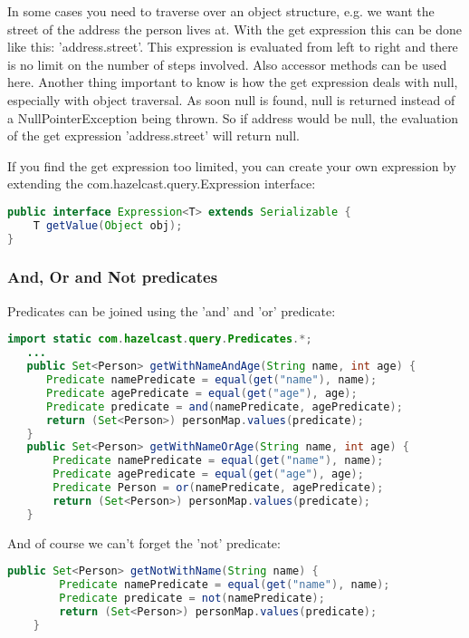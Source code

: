 In some cases you need to traverse over an object structure, e.g. we want the street of the address the person lives at. With the get expression this can be done like this: 'address.street'. This expression is evaluated from left to right and there is no limit on the number of steps involved. Also accessor methods can be used here. Another thing important to know is how the get expression deals with null, especially with object traversal. As soon null is found, null is returned instead of a NullPointerException being thrown. So if address would be null, the evaluation of the get expression 'address.street' will return null.

If you find the get expression too limited, you can create your own expression by extending the com.hazelcast.query.Expression interface:
\begin{lstlisting}[language=java]
public interface Expression<T> extends Serializable {
    T getValue(Object obj);
}
\end{lstlisting}

\subsubsection*{And, Or and Not predicates}
Predicates can be joined using the 'and' and 'or' predicate:
\begin{lstlisting}[language=java]
import static com.hazelcast.query.Predicates.*;
   ...
   public Set<Person> getWithNameAndAge(String name, int age) {
      Predicate namePredicate = equal(get("name"), name);
      Predicate agePredicate = equal(get("age"), age);
      Predicate predicate = and(namePredicate, agePredicate);
      return (Set<Person>) personMap.values(predicate);
   }
   public Set<Person> getWithNameOrAge(String name, int age) {
       Predicate namePredicate = equal(get("name"), name);
       Predicate agePredicate = equal(get("age"), age);
       Predicate Person = or(namePredicate, agePredicate);
       return (Set<Person>) personMap.values(predicate);
   }
\end{lstlisting}
And of course we can't forget the 'not' predicate:
\begin{lstlisting}[language=java]
    public Set<Person> getNotWithName(String name) {
        Predicate namePredicate = equal(get("name"), name);
        Predicate predicate = not(namePredicate);
        return (Set<Person>) personMap.values(predicate);
    }
\end{lstlisting}

